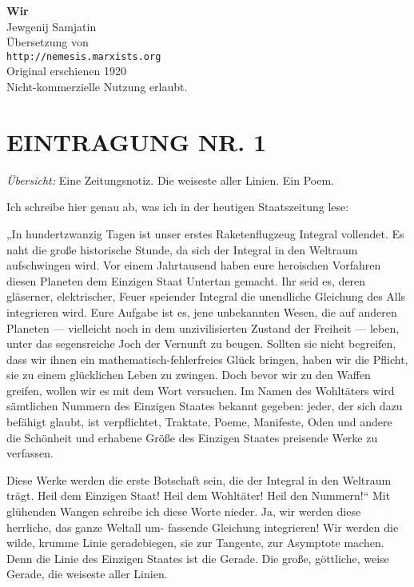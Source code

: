 \usepackage[ngerman]{babel}
\usepackage[T1]{fontenc}
\usepackage{textcomp}



\newcommand{\uebersicht}[1]{#1\medskip\par\noindent}
\newcommand\wurzel{$\sqrt{-1}$}


\raggedbottom
\begin{center}
\textbf{\huge\textsf{Wir}}\\
\bigskip
{\large Jewgenij Samjatin}\\
\bigskip
Übersetzung von\\
\texttt{http://nemesis.marxists.org}\\
\bigskip
Original erschienen 1920\\
\bigskip
Nicht-kommerzielle Nutzung erlaubt.
\end{center}

\section{EINTRAGUNG NR. 1}

\uebersicht{\emph{Übersicht:} Eine Zeitungsnotiz. Die weiseste
aller Linien. Ein Poem.}
Ich schreibe hier genau ab, was ich in der heutigen Staatszeitung
lese:

„In hundertzwanzig Tagen ist unser erstes Raketenflugzeug Integral
vollendet. Es naht die große historische Stunde, da sich der
Integral in den Weltraum aufschwingen wird. Vor einem Jahrtausend
haben eure heroischen Vorfahren diesen Planeten dem Einzigen Staat
Untertan gemacht. Ihr seid es, deren gläserner, elektrischer, Feuer
speiender Integral die unendliche Gleichung des Alls integrieren
wird. Eure Aufgabe ist es, jene unbekannten Wesen, die auf anderen
Planeten — vielleicht noch in dem unzivilisierten Zustand der
Freiheit — leben, unter das segensreiche Joch der Vernunft zu
beugen. Sollten sie nicht begreifen, dass wir ihnen ein
mathematisch-fehlerfreies Glück bringen, haben wir die Pflicht, sie
zu einem glücklichen Leben zu zwingen. Doch bevor wir zu den Waffen
greifen, wollen wir es mit dem Wort versuchen. Im Namen des
Wohltäters wird sämtlichen Nummern des Einzigen Staates bekannt
gegeben: jeder, der sich dazu befähigt glaubt, ist verpflichtet,
Traktate, Poeme, Manifeste, Oden und andere die Schönheit und
erhabene Größe des Einzigen Staates preisende Werke zu verfassen.

Diese Werke werden die erste Botschaft sein, die der Integral in
den Weltraum trägt. Heil dem Einzigen Staat! Heil dem Wohltäter!
Heil den Nummern!“ Mit glühenden Wangen schreibe ich diese Worte
nieder. Ja, wir werden diese herrliche, das ganze Weltall um-
fassende Gleichung integrieren! Wir werden die wilde, krumme Linie
geradebiegen, sie zur Tangente, zur Asymptote machen. Denn die
Linie des Einzigen Staates ist die Gerade. Die große, göttliche,
weise Gerade, die weiseste aller Linien.


